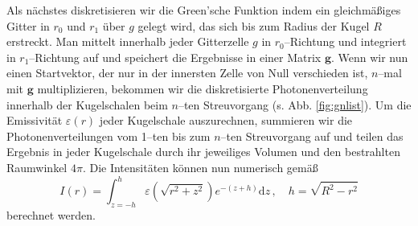 	Als nächstes diskretisieren wir die Green'sche Funktion indem ein gleichmäßiges Gitter in $r_0$ und $r_1$ über $g$ gelegt wird, das sich bis zum Radius der Kugel $R$ erstreckt. Man mittelt innerhalb jeder Gitterzelle $g$ in $r_0$--Richtung und integriert in $r_1$--Richtung auf und speichert die Ergebnisse in einer Matrix $\mathbf{g}$. Wenn wir nun einen Startvektor, der nur in der innersten Zelle von Null verschieden ist, $n$--mal mit $\mathbf{g}$ multiplizieren, bekommen wir die diskretisierte Photonenverteilung innerhalb der Kugelschalen beim $n$--ten Streuvorgang (s. Abb. \ref{fig:gnlist}). Um die Emissivität $\varepsilon(r)$ jeder Kugelschale auszurechnen, summieren wir die Photonenverteilungen vom 1--ten bis zum $n$--ten Streuvorgang auf und teilen das Ergebnis in jeder Kugelschale durch ihr jeweiliges Volumen und den bestrahlten Raumwinkel $4\pi$. Die Intensitäten können nun numerisch gemäß
	\begin{equation}
		I(r) = \int_{z=-h}^h \varepsilon\left(\sqrt{r^2+z^2}\right) e^{-(z+h)}\text{d}z\,,\quad h=\sqrt{R^2-r^2}
		\label{eq:testprob_intensity_calculation}
	\end{equation}
	berechnet werden.
	
	
	
	\vfill
	\pagebreak
